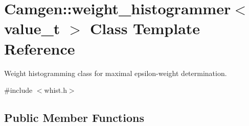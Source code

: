 \hypertarget{a00576}{\section{Camgen\-:\-:weight\-\_\-histogrammer$<$ value\-\_\-t $>$ Class Template Reference}
\label{a00576}
}


Weight histogramming class for maximal epsilon-\/weight determination.  




{\ttfamily \#include $<$whist.\-h$>$}

\subsection*{Public Member Functions}
